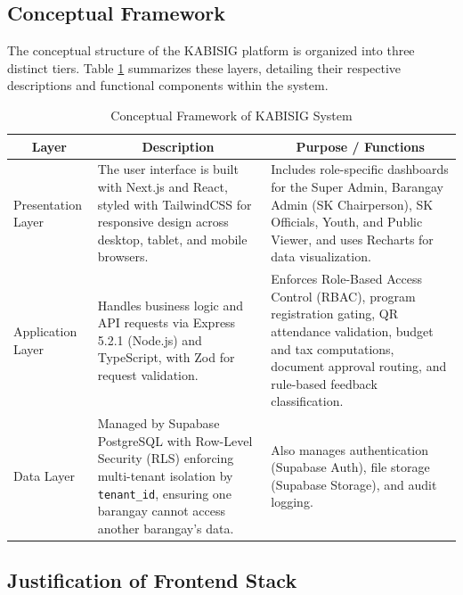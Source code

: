 \subsection{Conceptual Framework}
\label{subsec:conceptual_framework}

\hspace*{\parindent}The conceptual structure of the KABISIG platform is organized into three distinct tiers. Table \ref{tab:conceptual_framework} summarizes these layers, detailing their respective descriptions and functional components within the system.

\begin{table}[H]
\centering
\caption{Conceptual Framework of KABISIG System}
\label{tab:conceptual_framework}
\begin{tabular}{|l|p{3.5cm}|p{6.5cm}|}
\hline
\multicolumn{1}{|c|}{\textbf{Layer}} & \multicolumn{1}{c|}{\textbf{Description}} & \multicolumn{1}{c|}{\textbf{Purpose / Functions}} \\ \hline
Presentation Layer & The user interface is built with Next.js and React, styled with TailwindCSS for responsive design across desktop, tablet, and mobile browsers. & Includes role-specific dashboards for the Super Admin, Barangay Admin (SK Chairperson), SK Officials, Youth, and Public Viewer, and uses Recharts for data visualization. \\ \hline
Application Layer & Handles business logic and API requests via Express 5.2.1 (Node.js) and TypeScript, with Zod for request validation. & Enforces Role-Based Access Control (RBAC), program registration gating, QR attendance validation, budget and tax computations, document approval routing, and rule-based feedback classification. \\ \hline
Data Layer & Managed by Supabase PostgreSQL with Row-Level Security (RLS) enforcing multi-tenant isolation by \texttt{tenant\_id}, ensuring one barangay cannot access another barangay's data. & Also manages authentication (Supabase Auth), file storage (Supabase Storage), and audit logging. \\ \hline
\end{tabular}
\end{table}
\vspace{10mm}

\subsection{Justification of Frontend Stack}
\label{subsec:justification_of_frontend_stack}

